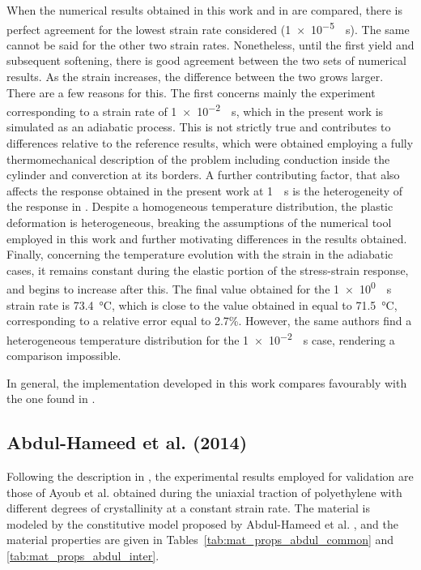When the numerical results obtained in this work and in \cite{haoUnifiedAmorphousCrystalline2022} are compared, there is perfect agreement for the lowest strain rate considered (\SI{1e-5}{\per\second}).
The same cannot be said for the other two strain rates.
Nonetheless, until the first yield and subsequent softening, there is good agreement between the two sets of numerical results.
As the strain increases, the difference between the two grows larger.
There are a few reasons for this.
The first concerns mainly the experiment corresponding to a strain rate of \SI{1e-2}{\per\second}, which in the present work is simulated as an adiabatic process.
This is not strictly true and contributes to differences relative to the reference results, which were obtained employing a fully thermomechanical description of the problem including conduction inside the cylinder and converction at its borders.
A further contributing factor, that also affects the response obtained in the present work at \SI{1}{\per\second} is the heterogeneity of the response in \cite{haoUnifiedAmorphousCrystalline2022}.
Despite a homogeneous temperature distribution, the plastic deformation is heterogeneous, breaking the assumptions of the numerical tool employed in this work and further motivating differences in the results obtained.
Finally, concerning the temperature evolution with the strain in the adiabatic cases, it remains constant during the elastic portion of the stress-strain response, and begins to increase after this.
The final value obtained for the \SI{1e0}{\per\second} strain rate is \SI{73.4}{\celsius}, which is close to the value obtained in \cite{haoUnifiedAmorphousCrystalline2022} equal to \SI{71.5}{\celsius}, corresponding to a relative error equal to 2.7\%.
However, the same authors find a heterogeneous temperature distribution for the \SI{1e-2}{\per\second} case, rendering a comparison impossible.

In general, the implementation developed in this work compares favourably with the one found in \cite{haoUnifiedAmorphousCrystalline2022}.

\subsection{Abdul-Hameed et al. (2014)}

Following the description in \cite{abdul-hameedTwophaseHyperelasticviscoplasticConstitutive2014}, the experimental results employed for validation are those of Ayoub et al. \citep{ayoubEffectsCrystalContent2011} obtained during the uniaxial traction of polyethylene with different degrees of crystallinity at a constant strain rate.
The material is modeled by the constitutive model proposed by Abdul-Hameed et al. \citep{abdul-hameedTwophaseHyperelasticviscoplasticConstitutive2014}, and the material properties are given in Tables~\ref{tab:mat_props_abdul_common} and \ref{tab:mat_props_abdul_inter}.
%

